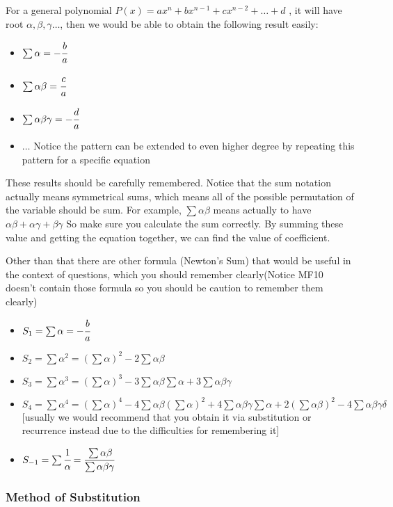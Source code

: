 \documentclass[]{article}
\begin{document}
For a general polynomial
\(P(x) = ax^n + bx^{n-1} + cx^{n-2} + \dots + d\) , it will have root
\(\alpha, \beta, \gamma \dots\), then we would be able to obtain the
following result easily:

\begin{itemize}
\item
  \(\sum \alpha = -\cfrac{b}{a}\)
\item
  \(\sum \alpha\beta = \cfrac{c}{a}\)
\item
  \(\sum \alpha \beta\gamma = -\cfrac{d}{a}\)
\item
  \(\dots\) Notice the pattern can be extended to even higher degree by
  repeating this pattern for a specific equation
\end{itemize}

These results should be carefully remembered. Notice that the sum
notation actually means symmetrical sums, which means all of the
possible permutation of the variable should be sum. For example,
\(\sum \alpha \beta \) means actually to have
\(\alpha \beta + \alpha \gamma + \beta \gamma\) So make sure you
calculate the sum correctly. By summing these value and getting the
equation together, we can find the value of coefficient.

Other than that there are other formula (Newton's Sum) that would be
useful in the context of questions, which you should remember
clearly(Notice MF10 doesn't contain those formula so you should be
caution to remember them clearly)

\begin{itemize}
\item
  \(S_1 = \sum \alpha = -\cfrac{b}{a}\)
\item
  \(S_2 = \sum{\alpha}^2 = (\sum \alpha)^2 - 2\sum \alpha \beta\)
\item
  \(S_3=\sum \alpha^3 = (\sum \alpha)^3 - 3\sum \alpha \beta\sum\alpha+3\sum \alpha\beta\gamma\)
\item
  \(S_4=\sum \alpha^4  = (\sum \alpha)^4 - 4\sum \alpha\beta(\sum \alpha)^2 +4\sum\alpha\beta\gamma\sum\alpha+2(\sum\alpha\beta)^2 - 4\sum\alpha\beta\gamma\delta\)
  {[}usually we would recommend that you obtain it via substitution or
  recurrence instead due to the difficulties for remembering it{]}
\item
  \( S_{-1}=\sum \cfrac{1}{\alpha} = \cfrac{\sum \alpha \beta}{\sum \alpha \beta\gamma}\)
\end{itemize}

\subsubsection{Method of Substitution}\label{header-n257}
\end{document}
